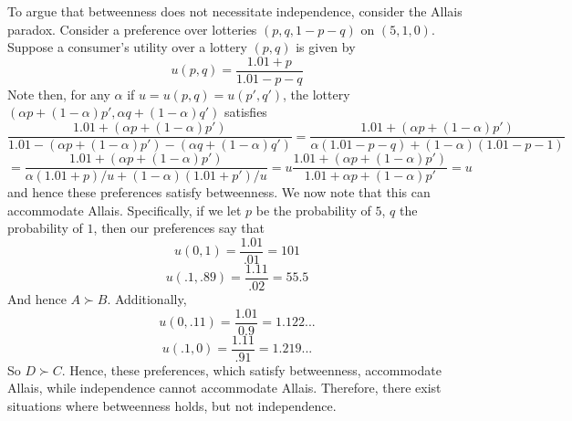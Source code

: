 \documentclass[10pt,letter]{article}
\begin{document}
To argue that betweenness does not necessitate independence, consider the Allais paradox. Consider a preference over lotteries $(p, q, 1-p-q)$ on $(5,1,0)$. Suppose a consumer's utility over a lottery $(p,q)$ is given by
\[u(p,q) = \frac{1.01 + p}{1.01 - p - q}    \]
Note then, for any $\alpha$ if $u = u(p,q) = u(p',q')$, the lottery $ (\alpha p + (1-\alpha) p', \alpha q + (1-\alpha)q' ) $ satisfies
\[ \frac{1.01 + (\alpha p + (1-\alpha)p')}{1.01 - (\alpha p + (1-\alpha) p') - (\alpha q + (1-\alpha)q')} = \frac{1.01+ (\alpha p + (1-\alpha)p')}{\alpha(1.01 - p - q) + (1-\alpha)(1.01-p-1)} \] \[ = \frac{1.01+ (\alpha p + (1-\alpha)p')}{\alpha(1.01 + p)/u + (1-\alpha)(1.01 + p')/u} = u \frac{1.01+(\alpha p + (1-\alpha)p')}{1.01+ \alpha p + (1-\alpha) p'} = u  \]
and hence these preferences satisfy betweenness. We now note that this can accommodate Allais. Specifically, if we let $p$ be the probability of $5$, $q$ the probability of $1$, then our preferences say that
\[ u(0,1) = \frac{1.01}{.01} = 101 \]
\[ u(.1, .89) = \frac{1.11}{.02} = 55.5 \]
And hence $A \succ B$. Additionally,
\[ u(0, .11) =\frac{1.01}{0.9} = 1.122... \]
\[ u(.1, 0) = \frac{1.11}{.91} = 1.219...\]
So $D \succ C$. Hence, these preferences, which satisfy betweenness, accommodate Allais, while independence cannot accommodate Allais. Therefore, there exist situations where betweenness holds, but not independence.
\end{document}
